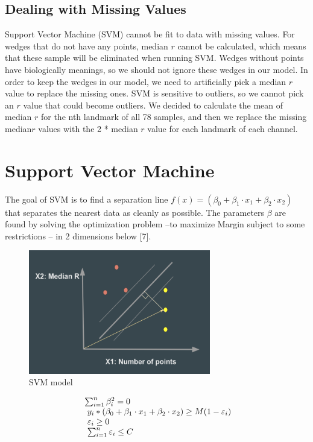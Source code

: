 \documentclass[10pt,letterpaper]{article}
\begin{document}
\subsection{Dealing with Missing
Values}\label{dealing-with-missing-values}

Support Vector Machine (SVM) cannot be fit to data with missing values.
For wedges that do not have any points, median \(r\) cannot be
calculated, which means that these sample will be eliminated when
running SVM. Wedges without points have biologically meanings, so we
should not ignore these wedges in our model. In order to keep the wedges
in our model, we need to artificially pick a median \(r\) value to
replace the missing ones. SVM is sensitive to outliers, so we cannot
pick an \(r\) value that could become outliers. We decided to calculate
the mean of median \(r\) for the nth landmark of all 78 samples, and
then we replace the missing median\(r\) values with the 2 * median \(r\)
value for each landmark of each channel.

\section{Support Vector Machine}\label{support-vector-machine-1}

The goal of SVM is to find a separation line
\(f(x) = (\beta_0 + \beta_1 \cdot x_1 + \beta_2 \cdot x_2)\) that
separates the nearest data as cleanly as possible. The parameters
\(\beta\) are found by solving the optimization problem --to maximize
Margin subject to some restrictions -- in 2 dimensions below {[}7{]}.

\begin{figure}[h]
\includegraphics[width=3.12in]{figures/svm_fig} \caption{SVM model}\label{fig:svmfig}
\end{figure}

\begin{equation}
  \left.
  \begin{array}{l@{\,}l}
     \sum_{i=1}^n \beta_i^2 = 0 \\
     \ y_i * ( \beta_0 + \beta_1 \cdot x_1 + \beta_2 \cdot x_2 ) \geq M(1-\varepsilon_i) \\
     \ \varepsilon_i \geq 0 \\
     \ \sum_{i=1}^n \varepsilon_i \leq C \\
  \end{array}
  \right.
\end{equation}
\end{document}

